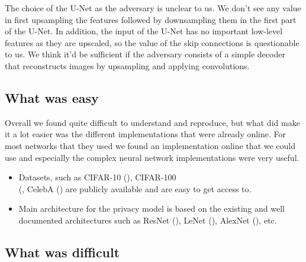 The choice of the U-Net as the adversary is unclear to us. We don't see any value in first upsampling the features followed by downsampling them in the first part of the U-Net. In addition, the input of the U-Net has no important low-level features as they are upscaled, so the value of the skip connections is questionable to us. We think it'd be sufficient if the adversary consists of a simple decoder that reconstructs images by upsampling and applying convolutions.

\newpage
\subsection{What was easy}


Overall we found \citet{xiang2020interpretable} quite difficult to understand and reproduce, but what did make it a lot easier was the different implementations that were already online. For most networks that they used we found an implementation online that we could use and especially the complex neural network implementations were very useful. 

\begin{itemize}
    \item Datasets, such as CIFAR-10 (\citet{cifar10}), CIFAR-100 \\ (\citet{cifar100}, CelebA (\citet{CelebA}) are publicly available and are easy to get access to.
    \item Main architecture for the privacy model is based on the existing and well documented architectures such as ResNet (\citet{DBLP:journals/corr/HeZRS15}), LeNet (\citet{lecun1998gradient}), AlexNet (\citet{AlexNet}), etc.
\end{itemize}

\subsection{What was difficult}


